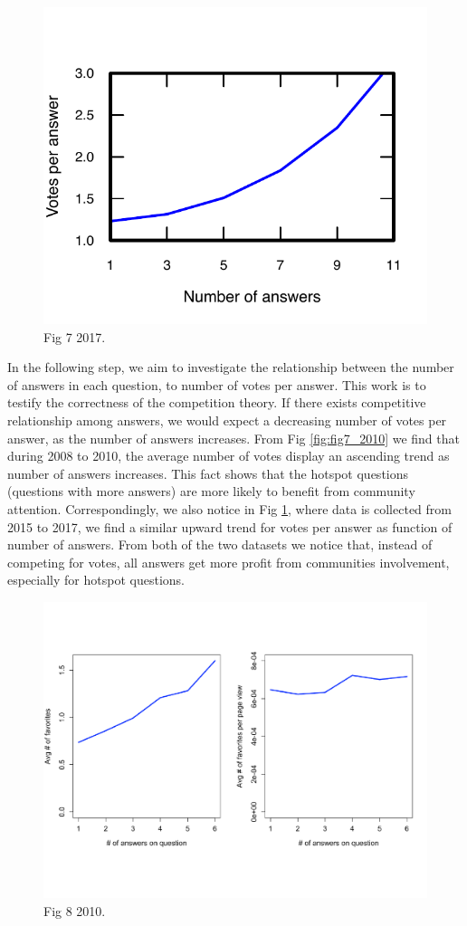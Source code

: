 \begin{figure}[!t]
	\centering
	\includegraphics[width=0.8\columnwidth]{img/Fig7_2017.pdf}
	\caption{Fig 7 2017.}
	\label{fig:fig7_2017}
\end{figure}
In the following step, we aim to investigate the relationship between the number of answers in each question, to number of votes per answer. This work is to testify the correctness of the competition theory. If there exists competitive relationship among answers, we would expect a decreasing number of votes per answer, as the number of answers increases. From Fig \ref{fig:fig7_2010} we find that during 2008 to 2010, the average number of votes display an ascending trend as number of answers increases. This fact shows that the hotspot questions (questions with more answers) are more likely to benefit from community attention. Correspondingly, we also notice in Fig \ref{fig:fig7_2017}, where data is collected from 2015 to 2017, we find a similar upward trend for votes per answer as function of number of answers. From both of the two datasets we notice that, instead of competing for votes, all answers get more profit from communities involvement, especially for hotspot questions. 

\begin{figure}[!t]
	\centering
	\includegraphics[width=\columnwidth]{img/Fig8_2010.pdf}
	\caption{Fig 8 2010.}
	\label{fig:fig8_2010}
\end{figure}

